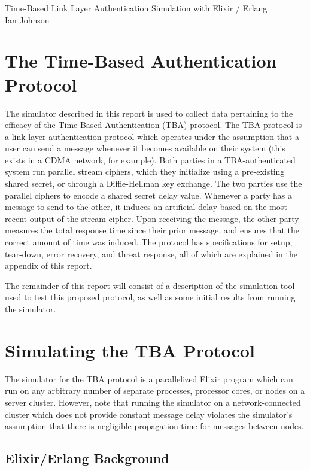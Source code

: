 \documentclass[12pt]{article}
\begin{document}
\begin{center}
      {\Huge Time-Based Link Layer Authentication Simulation with Elixir / Erlang}\\[0.5cm]
      {\Large Ian Johnson}
\end{center}

\section{The Time-Based Authentication Protocol}

The simulator described in this report is used to collect data pertaining to the efficacy of the Time-Based Authentication (TBA) protocol. The TBA protocol is a link-layer authentication protocol which operates under the assumption that a user can send a message whenever it becomes available on their system (this exists in a CDMA network, for example). Both parties in a TBA-authenticated system run parallel stream ciphers, which they initialize using a pre-existing shared secret, or through a Diffie-Hellman key exchange. The two parties use the parallel ciphers to encode a shared secret delay value. Whenever a party has a message to send to the other, it induces an artificial delay based on the most recent output of the stream cipher. Upon receiving the message, the other party measures the total response time since their prior message, and ensures that the correct amount of time was induced. The protocol has specifications for setup, tear-down, error recovery, and threat response, all of which are explained in the appendix of this report.

The remainder of this report will consist of a description of the simulation tool used to test this proposed protocol, as well as some initial results from running the simulator.

\section{Simulating the TBA Protocol}

The simulator for the TBA protocol is a parallelized Elixir program which can run on any arbitrary number of separate processes, processor cores, or nodes on a server cluster. However, note that running the simulator on a network-connected cluster which does not provide constant message delay violates the simulator's assumption that there is negligible propagation time for messages between nodes.

\subsection{Elixir/Erlang Background}
\end{document}
